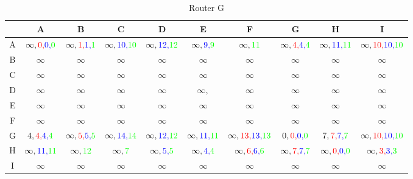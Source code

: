 \documentclass[a4paper,10pt]{article}
\begin{document}
\begin{table}[H]
\centering
\begin{tabular}{|c|c|c|c|c|c|c|c|c|c|} \hline
 & A & B & C & D & E & F & G & H & I  \\\hline
A & $ \infty,{\color{red}0,}{\color{blue}0,}{\color{green}0} $ & $\infty,{\color{red}1,}{\color{blue}1,}{\color{green}1} $ & $\infty,{\color{blue}10,}{\color{green}10} $ & $\infty,{\color{blue}12,}{\color{green}12} $ & $ \infty,{\color{blue}9,}{\color{green}9}$ & $\infty,{\color{green}11}$ & $ \infty,{\color{red}4,}{\color{blue}4,}{\color{green}4}$ & $\infty,{\color{blue}11,}{\color{green}11} $ & $ \infty,{\color{red}10,}{\color{blue}10,}{\color{green}10}$ \\\hline
B & $\infty $ & $\infty $ & $\infty $ & $\infty $ & $ \infty$ & $\infty$ & $ \infty$ & $\infty $ & $ \infty$ \\\hline
C & $\infty $ & $\infty $ & $\infty $ & $\infty $ & $ \infty$ & $\infty$ & $ \infty$ & $\infty $ & $ \infty$ \\\hline
D & $\infty $ & $\infty $ & $\infty $ & $\infty $ & $ \infty,$ & $\infty $ & $ \infty$ & $\infty $ & $ \infty$ \\\hline
E & $\infty $ & $\infty $ & $\infty $ & $\infty $ & $ \infty$ & $\infty $ & $ \infty$ & $\infty $ & $ \infty$ \\\hline
F & $\infty $ & $\infty $ & $\infty $ & $\infty $ & $ \infty$ & $\infty $ & $ \infty$ & $\infty $ & $ \infty$ \\\hline
G & $4,{\color{red}4,}{\color{blue}4,}{\color{green}4} $ & $\infty,{\color{red}5,}{\color{blue}5,}{\color{green}5} $ & $\infty,{\color{blue}14,}{\color{green}14} $ & $\infty,{\color{blue}12,}{\color{green}12} $ & $\infty,{\color{blue}11,}{\color{green}11} $ & $\infty,{\color{red}13,}{\color{blue}13,}{\color{green}13} $ & $0,{\color{red}0,}{\color{blue}0,}{\color{green}0} $ & $7,{\color{red}7,}{\color{blue}7,}{\color{green}7} $ & $\infty,{\color{red}10,}{\color{blue}10,}{\color{green}10}$ \\\hline
H & $ \infty,{\color{blue}11,}{\color{green}11}$ & $\infty,{\color{green}12} $ & $\infty,{\color{green}7} $ & $\infty,{\color{blue}5,}{\color{green}5} $ & $ \infty,{\color{blue}4,}{\color{green}4}$ & $\infty,{\color{red}6,}{\color{blue}6,}{\color{green}6} $ & $ \infty,{\color{red}7,}{\color{blue}7,}{\color{green}7}$ & $\infty,{\color{red}0,}{\color{blue}0,}{\color{green}0} $ & $ \infty,{\color{red}3,}{\color{blue}3,}{\color{green}3}$ \\\hline
I & $ \infty$ & $\infty $ & $ \infty$ & $ \infty$ & $ \infty$ & $ \infty$ & $ \infty$ & $ \infty$ & $ \infty$ \\\hline
\end{tabular}
\caption{Router G}
\end{table} \\
\end{document}

